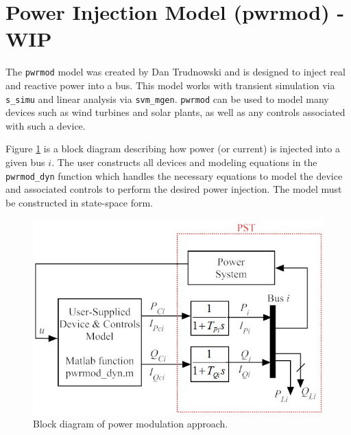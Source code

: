 \section{Power Injection Model (pwrmod) - WIP}  

The \verb|pwrmod| model was created by Dan Trudnowski and is designed to inject real and reactive power into a bus.
This model works with transient simulation via \verb|s_simu| and linear analysis via \verb|svm_mgen|.
\verb|pwrmod| can be used to model many devices such as wind turbines and solar plants, as well as any controls associated with such a device.

Figure \ref{fig: pwrmod BD} is a block diagram describing how power (or current) is injected into a given bus $i$.
The user constructs all devices and modeling equations in the \verb|pwrmod_dyn| function which handles the necessary equations to model the device and associated controls to perform the desired power injection.
The model must be constructed in state-space form.

\begin{figure}[H]
	\centering
	\footnotesize
	\includegraphics[width=.85\linewidth]{sections/pwrmod/BlockDiagram1}
	\caption{Block diagram of power modulation approach.}
	\label{fig: pwrmod BD}
\end{figure}%


